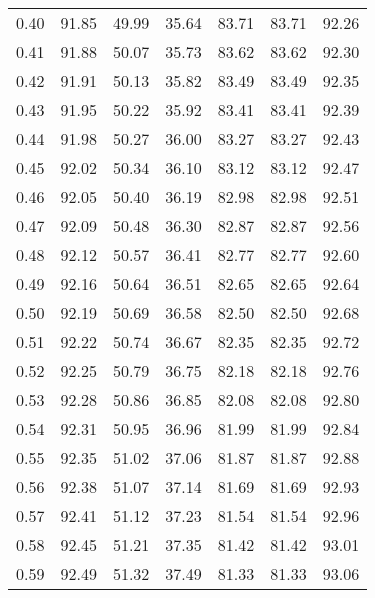 \begin{tabular}{|c|c|c|c|c|c|c|}
      0.40 &     91.85 &     49.99 &      35.64 &   83.71 &      83.71 &         92.26 \\
      0.41 &     91.88 &     50.07 &      35.73 &   83.62 &      83.62 &         92.30 \\
      0.42 &     91.91 &     50.13 &      35.82 &   83.49 &      83.49 &         92.35 \\
      0.43 &     91.95 &     50.22 &      35.92 &   83.41 &      83.41 &         92.39 \\
      0.44 &     91.98 &     50.27 &      36.00 &   83.27 &      83.27 &         92.43 \\
      0.45 &     92.02 &     50.34 &      36.10 &   83.12 &      83.12 &         92.47 \\
      0.46 &     92.05 &     50.40 &      36.19 &   82.98 &      82.98 &         92.51 \\
      0.47 &     92.09 &     50.48 &      36.30 &   82.87 &      82.87 &         92.56 \\
      0.48 &     92.12 &     50.57 &      36.41 &   82.77 &      82.77 &         92.60 \\
      0.49 &     92.16 &     50.64 &      36.51 &   82.65 &      82.65 &         92.64 \\
      0.50 &     92.19 &     50.69 &      36.58 &   82.50 &      82.50 &         92.68 \\
      0.51 &     92.22 &     50.74 &      36.67 &   82.35 &      82.35 &         92.72 \\
      0.52 &     92.25 &     50.79 &      36.75 &   82.18 &      82.18 &         92.76 \\
      0.53 &     92.28 &     50.86 &      36.85 &   82.08 &      82.08 &         92.80 \\
      0.54 &     92.31 &     50.95 &      36.96 &   81.99 &      81.99 &         92.84 \\
      0.55 &     92.35 &     51.02 &      37.06 &   81.87 &      81.87 &         92.88 \\
      0.56 &     92.38 &     51.07 &      37.14 &   81.69 &      81.69 &         92.93 \\
      0.57 &     92.41 &     51.12 &      37.23 &   81.54 &      81.54 &         92.96 \\
      0.58 &     92.45 &     51.21 &      37.35 &   81.42 &      81.42 &         93.01 \\
      0.59 &     92.49 &     51.32 &      37.49 &   81.33 &      81.33 &         93.06 \\

\end{tabular}
